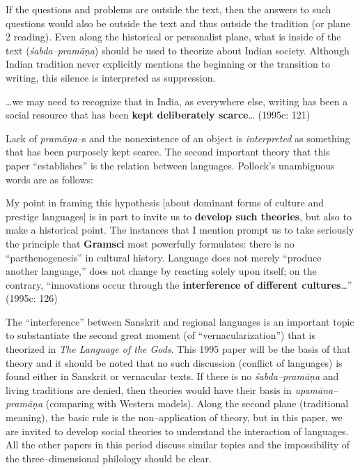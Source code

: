 If the questions and problems are outside the text, then the answers to such questions would also be outside the text and thus outside the tradition (or plane 2 reading). Even along the historical or personalist plane, what is inside of the text (\textit{śabda–pramāṇa}) should be used to theorize about Indian society. Although Indian tradition never explicitly mentions the beginning or the transition to writing, this silence is interpreted as suppression.

\begin{myquote}
…we may need to recognize that in India, as everywhere else, writing has been a social resource that has been \textbf{kept deliberately scarce}… (1995c: 121)
\end{myquote}

Lack of \textit{pramāṇa}–s and the nonexistence of an object is \textit{interpreted} as something that has been purposely kept scarce. The second important theory that this paper “establishes” is the relation between languages. Pollock’s unambiguous words are as follows:

\begin{myquote}
My point in framing this hypothesis [about dominant forms of culture and prestige languages] is in part to invite us to \textbf{develop such theories}, but also to make a historical point. The instances that I mention prompt us to take seriously the principle that\textbf{ Gramsci }most powerfully formulates: there is no “parthenogenesis” in cultural history. Language does not merely “produce another language,” does not change by reacting solely upon itself; on the contrary, “innovations occur through the \textbf{interference of different cultures}…” (1995c: 126)
\end{myquote}

The “interference” between Sanskrit and regional languages is an important topic to substantiate the second great moment (of “vernacularization”) that is theorized in \textit{The Language of the Gods}. This 1995 paper will be the basis of that theory and it should be noted that no such discussion (conflict of languages) is found either in Sanskrit or vernacular texts. If there is no \textit{śabda–pramāṇa} and living traditions are denied, then theories would have their basis in \textit{upamāna–pramāṇa} (comparing with Western models). Along the second plane (traditional meaning), the basic rule is the non–application of theory, but in this paper, we are invited to develop social theories to understand the interaction of languages. All the other papers in this period discuss similar topics and the impossibility of the three–dimensional philology should be clear.


